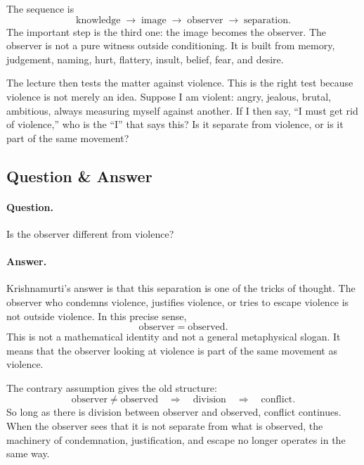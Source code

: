 The sequence is
\begin{equation}
\text{knowledge}
\;\longrightarrow\;
\text{image}
\;\longrightarrow\;
\text{observer}
\;\longrightarrow\;
\text{separation}.
\end{equation}
The important step is the third one: the image becomes the observer. The observer is not a pure witness outside conditioning. It is built from memory, judgement, naming, hurt, flattery, insult, belief, fear, and desire.

The lecture then tests the matter against violence. This is the right test because violence is not merely an idea. Suppose I am violent: angry, jealous, brutal, ambitious, always measuring myself against another. If I then say, ``I must get rid of violence,'' who is the ``I'' that says this? Is it separate from violence, or is it part of the same movement?

\subsection{Question \& Answer}

\paragraph{Question.}
Is the observer different from violence?

\paragraph{Answer.}
Krishnamurti's answer is that this separation is one of the tricks of thought. The observer who condemns violence, justifies violence, or tries to escape violence is not outside violence. In this precise sense,
\begin{equation}
\text{observer} = \text{observed}.
\end{equation}
This is not a mathematical identity and not a general metaphysical slogan. It means that the observer looking at violence is part of the same movement as violence.

The contrary assumption gives the old structure:
\begin{equation}
\text{observer} \neq \text{observed}
\quad\Longrightarrow\quad
\text{division}
\quad\Longrightarrow\quad
\text{conflict}.
\end{equation}
So long as there is division between observer and observed, conflict continues. When the observer sees that it is not separate from what is observed, the machinery of condemnation, justification, and escape no longer operates in the same way.

